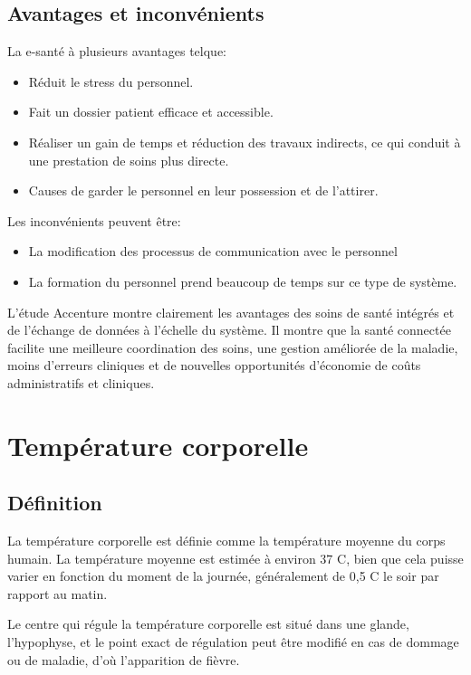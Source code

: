 \documentclass[12pt]{article}
\begin{document}
\subsection{Avantages et inconvénients}
La e-santé à plusieurs avantages telque:
\begin{itemize}
	\item Réduit le stress du personnel.
	\item Fait un dossier patient efficace et accessible.
	\item Réaliser un gain de temps et réduction des travaux indirects, ce qui conduit à une prestation de soins plus directe.
	\item Causes de garder le personnel en leur possession et de l'attirer.
\end{itemize}

Les inconvénients peuvent être:
\begin{itemize}
	\item La modification des processus de communication avec le personnel
	\item La formation du personnel prend beaucoup de temps sur ce type de système.\\
\end{itemize}

L'étude Accenture \cite{28} montre clairement les avantages des soins de santé intégrés et de l'échange de données à l'échelle du système. Il montre que la santé connectée facilite une meilleure coordination des soins, une gestion améliorée de la maladie, moins d'erreurs cliniques et de nouvelles opportunités d'économie de coûts administratifs et cliniques.

\section{Température corporelle}
\subsection{Définition}
La température corporelle est définie comme la température moyenne du corps humain. La température moyenne est estimée à environ 37 C\textdegree{}, bien que cela puisse varier en fonction du moment de la journée, généralement de 0,5 C\textdegree{} le soir par rapport au matin.

Le centre qui régule la température corporelle est situé dans une glande, l'hypophyse, et le point exact de régulation peut être modifié en cas de dommage ou de maladie, d'où l'apparition de fièvre. 
\end{document}
